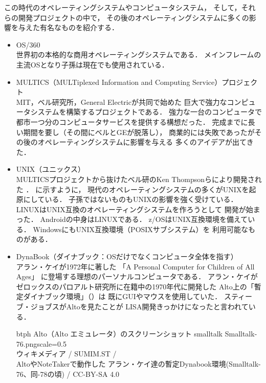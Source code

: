 この時代のオペレーティングシステムやコンピュータシステム，
そして，それらの開発プロジェクトの中で，
その後のオペレーティングシステムに多くの影響を与えた有名なものを紹介する．

\begin{itemize}
\item OS/360 \\
世界初の本格的な商用オペレーティングシステムである．
メインフレームの主流OSとなり子孫は現在でも使用されている\cite{os360}．

\item MULTICS（MULTiplexed Information and Computing Service）プロジェクト
\cite{third} \\
MIT，ベル研究所，General Electricが共同で始めた
巨大で強力なコンピュータシステムを構築するプロジェクトである．
強力な一台のコンピュータで
都市一つ分のコンピュータサービスを提供する構想だった．
完成までに長い期間を要し（その間にベルとGEが脱落し），
商業的には失敗であったがその後のオペレーティングシステムに影響を与える
多くのアイデアが出てきた．

\item UNIX（ユニックス） \\
MULTICSプロジェクトから抜けたベル研のKen Thompsonらにより開発された
\cite{unix}．
に示すように，
現代のオペレーティングシステムの多くがUNIXを起原にしている．
子孫ではないものもUNIXの影響を強く受けている．
LINUXはUNIX互換のオペレーティングシステムを作ろうとして
開発が始まった\cite{linux}．
Androidの中身はLINUXである\cite{android}．
z/OSはUNIX互換環境を備えている\cite{zos}．
WindowsにもUNIX互換環境（POSIXサブシステム）を
利用可能なものがある\cite{windows}．

\item DynaBook（ダイナブック：OSだけでなくコンピュータ全体を指す）
\cite{dynabook2} \\
アラン・ケイが1972年に著した
「A Personal Computer for Children of All Ages」\cite{key72, key72J}
に登場する理想のパーソナルコンピュータである．
アラン・ケイがゼロックスのパロアルト研究所に在籍中の1970年代に開発した
Alto上の「暫定ダイナブック環境」（）は
既にGUIやマウスを使用していた．
スティーブ・ジョブスがAltoを見たことが
LISA開発きっかけになったと言われている\cite{dynabook}．

\begin{myfig}{btph}
{Alto（Alto エミュレータ）のスクリーンショット}
{smalltalk}
\myincludegraphics
{Smalltalk-76.png}{scale=0.5}\\
{\small
ウィキメディア /
SUMIM.ST /\\
AltoやNoteTakerで動作した
アラン・ケイ達の暫定Dynabook環境(Smalltalk-76、同-78の頃) /
CC-BY-SA 4.0
}
\end{myfig}

\end{itemize}

